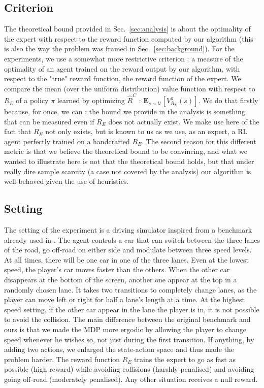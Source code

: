 \documentclass[smallextended]{svjour3}
\begin{document}
\subsection{Criterion}
\label{subsec:criterion}
The theoretical bound provided in Sec.~\ref{sec:analysis} is about the optimality of the expert with respect to the reward function computed by our algorithm (this is also the way the problem was framed in Sec.~\ref{sec:background}). For the experiments, we use a somewhat more restrictive criterion : a measure of the optimality of an agent trained on the reward output by our algorithm, with respect to the "true" reward function, the reward function of the expert. We compare the mean (over the uniform distribution) value function with respect to $R_E$ of a policy $\pi$ learned by optimizing $\hat R^C$ : $\mathbf{E}_{s\sim\mathcal{U}}[V^{\pi}_{R_E}(s)]$. We do that firstly because, for once, we can : the bound we provide in the analysis is something that can be measured even if $R_E$ does not actually exist. We make use here of the fact that $R_E$ not only exists, but is known to us as we use, as an expert, a RL agent perfectly trained on a handcrafted $R_E$. The second reason for this different metric is that we believe the theoretical bound to be convincing, and what we wanted to illustrate here is not that the theoretical bound holds, but that under really dire sample scarcity (a case not covered by the analysis) our algorithm is well-behaved given the use of heuristics.
\subsection{Setting}
\label{subsec:setting}
The setting of the experiment is a driving simulator inspired from a benchmark already used in \cite{syed2008apprenticeship,syed2008game}. The agent controls a car that can switch between the three lanes of the road, go off-road on either side and modulate between three speed levels. At all times, there will be one car in one of the three lanes. Even at the lowest speed, the player's car moves faster than the others. When the other car disappears at the bottom of the screen, another one appear at the top in a randomly chosen lane. It takes two transitions to completely change lanes, as the player can move left or right for half a lane's length at a time. At the highest speed setting, if the other car appear in the lane the player is in, it is not possible to avoid the collision. The main difference between the original benchmark and ours is that we made the MDP more ergodic by allowing the player to change speed whenever he wishes so, not just during the first transition. If anything, by adding two actions, we enlarged the state-action space and thus made the problem harder.
The reward function $R_E$ trains the expert to go as fast as possible (high reward) while avoiding collisions (harshly penalised) and avoiding going off-road (moderately penalised). Any other situation receives a null reward.
\end{document}
